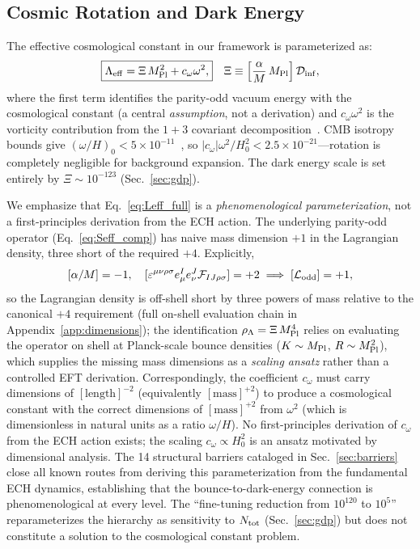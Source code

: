 \documentclass[aps,prd,twocolumn,superscriptaddress,showpacs,preprintnumbers,nofootinbib,longbibliography,floatfix]{revtex4-2}
\newcommand{\Leff}{\Lambda_{\rm eff}}
\newcommand{\Dinf}{\mathcal{D}_{\rm inf}}
\newcommand{\MPl}{M_{\rm Pl}}
\begin{document}
\subsection{Cosmic Rotation and Dark Energy}\label{sec:rotation}

The effective cosmological constant in our framework is parameterized as:
\begin{align}\label{eq:Leff_full}
\boxed{\Leff = \Xi\,\MPl^2 + c_\omega\omega^2,}\quad
\Xi\equiv \left[\frac{\alpha}{M}\,\MPl\right]\Dinf,
\end{align}
\label{eq:Leff}%
where the first term identifies the parity-odd vacuum energy with the cosmological constant (a central \textit{assumption}, not a derivation) and $c_\omega\omega^2$ is the vorticity contribution from the $1+3$ covariant decomposition~\cite{Ellis1989}. CMB isotropy bounds give $(\omega/H)_0 < 5\times 10^{-11}$~\cite{Saadeh2016}, so $|c_\omega|\omega^2/H_0^2 < 2.5\times 10^{-21}$---rotation is completely negligible for background expansion. The dark energy scale is set entirely by $\Xi \sim 10^{-123}$ (Sec.~\ref{sec:gdp}).

We emphasize that Eq.~\eqref{eq:Leff_full} is a \textit{phenomenological parameterization}, not a first-principles derivation from the ECH action. The underlying parity-odd operator (Eq.~\ref{eq:Seff_comp}) has naive mass dimension $+1$ in the Lagrangian density, three short of the required $+4$. Explicitly,
\begin{equation}\label{eq:dimcount}
[\alpha/M] = -1, \quad [\varepsilon^{\mu\nu\rho\sigma}e^I_\mu e^J_\nu \mathcal{F}_{IJ\rho\sigma}] = +2 \;\Longrightarrow\; [\mathcal{L}_{\rm odd}] = +1,
\end{equation}
so the Lagrangian density is off-shell short by three powers of mass relative to the canonical $+4$ requirement (full on-shell evaluation chain in Appendix~\ref{app:dimensions}); the identification $\rho_\Lambda = \Xi\,\MPl^4$ relies on evaluating the operator on shell at Planck-scale bounce densities ($K \sim \MPl$, $R\sim\MPl^2$), which supplies the missing mass dimensions as a \textit{scaling ansatz} rather than a controlled EFT derivation. Correspondingly, the coefficient $c_\omega$ must carry dimensions of $[\text{length}]^{-2}$ (equivalently $[\text{mass}]^{+2}$) to produce a cosmological constant with the correct dimensions of $[\text{mass}]^{+2}$ from $\omega^2$ (which is dimensionless in natural units as a ratio $\omega/H$). No first-principles derivation of $c_\omega$ from the ECH action exists; the scaling $c_\omega \propto H_0^2$ is an ansatz motivated by dimensional analysis. The 14 structural barriers cataloged in Sec.~\ref{sec:barriers} close all known routes from deriving this parameterization from the fundamental ECH dynamics, establishing that the bounce-to-dark-energy connection is phenomenological at every level. The ``fine-tuning reduction from $10^{120}$ to $10^5$'' reparameterizes the hierarchy as sensitivity to $N_{\rm tot}$ (Sec.~\ref{sec:gdp}) but does not constitute a solution to the cosmological constant problem.
\end{document}
